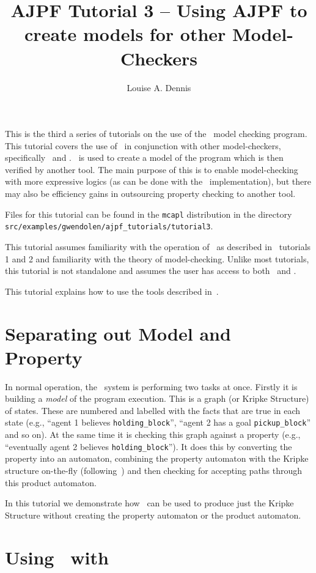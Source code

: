 \documentclass[a4]{article}
\author{Louise A. Dennis}
\title{AJPF Tutorial 3 -- Using AJPF to create models for other Model-Checkers}
\begin{document}
\maketitle
This is the third a series of tutorials on the use of the \ajpf\ model checking program.  This tutorial covers the use of \ajpf\ in conjunction with other model-checkers, specifically \spin\ and \prism.  \ajpf\ is used to create a model of the program which is then verified by another tool.  The main purpose of this is to enable model-checking with more expressive logics (as can be done with the \prism\ implementation), but there may also be efficiency gains in outsourcing property checking to another tool.

Files for this tutorial can be found in the \texttt{mcapl} distribution in the directory \texttt{src/examples/gwendolen/ajpf\_tutorials/tutorial3}.

This tutorial assumes familiarity with the operation of \ajpf\ as described in \ajpf\ tutorials 1 and 2 and familiarity with the theory of model-checking.  Unlike most tutorials, this tutorial is not standalone and assumes the user has access to both \spin\ and \prism.

This tutorial explains how to use the tools described in~\cite{dennis15:_two}.

\section{Separating out Model and Property}

In normal operation, the \ajpf\ system is performing two tasks at once.  Firstly it is building a \emph{model} of the program execution.  This is a graph (or Kripke Structure) of states.  These are numbered and labelled with the facts that are true in each state (e.g., ``agent 1 believes \texttt{holding\_block}'', ``agent 2 has a goal \texttt{pickup\_block}'' and so on).  At the same time it is checking this graph against a property (e.g., ``eventually agent 2 believes \texttt{holding\_block}'').  It does this by converting the property into an automaton, combining the property automaton with the Kripke structure on-the-fly (following~\cite{Gerth:1995:SOA:645837.670574,Courcoubetis92mea}) and then checking for accepting paths through this product automaton.

In this tutorial we demonstrate how \ajpf\ can be used to produce just the Kripke Structure without creating the property automaton or the product automaton.

\section{Using \ajpf\ with \spin}
\end{document}
